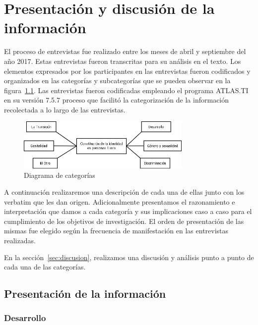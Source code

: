\chapter{Presentación y discusión de la información}\label{ch:informacion}

El proceso de entrevistas fue realizado entre los meses de abril y septiembre
del año 2017.
Estas entrevistas fueron transcritas para su análisis en el texto.
Los elementos expresados por los participantes en las entrevistas fueron
codificados y organizados en las categorías y subcategorías que se pueden
observar en la figura~\ref{fig:categorias}.
Las entrevistas fueron codificadas empleando el programa ATLAS.TI en su versión
7.5.7 proceso que facilitó la categorización de la información recolectada a lo
largo de las entrevistas.

\begin{figure}
    \centering
    \includegraphics[width=0.75\textwidth]{categorias}
    \caption{Diagrama de categorías}\label{fig:categorias}
\end{figure}

A continuación realizaremos una descripción de cada una de ellas junto con los
verbatim que les dan origen.
Adicionalmente presentamos el razonamiento e interpretación que damos a cada
categoría y sus implicaciones caso a caso para el cumplimiento de los objetivos
de investigación.
El orden de presentación de las mismas fue elegido
según la frecuencia de manifestación en las entrevistas realizadas.

En la sección~\ref{sec:discusion}, realizamos una discusión y análisis punto a
punto de cada una de las categorías.

\section{Presentación de la información}

\subsection{Desarrollo}

